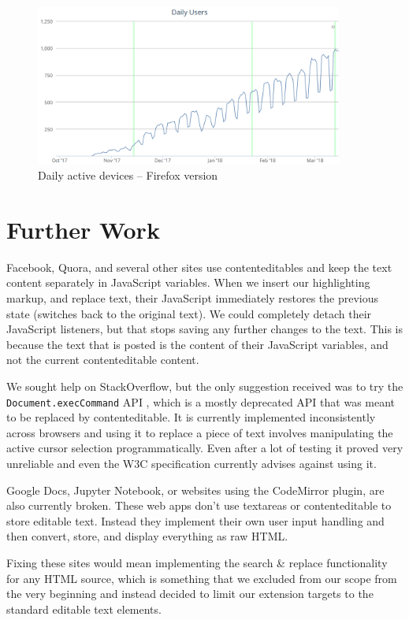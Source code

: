 \documentclass[bsc,frontabs,twoside,singlespacing,parskip,deptreport]{infthesis}
\begin{document}
\begin{figure}[h]
\centering
\includegraphics[width=0.9\textwidth]{../docs/firefox-version-users.png}
\caption{Daily active devices -- Firefox version}
\end{figure}

\section{Further Work}
Facebook, Quora, and several other sites use contenteditables and keep the text content separately in JavaScript variables. When we insert our highlighting markup, and replace text, their JavaScript immediately restores the previous state (switches back to the original text). We could completely detach their JavaScript listeners, but that stops saving any further changes to the text. This is because the text that is posted is the content of their JavaScript variables, and not the current contenteditable content.

We sought help on StackOverflow, but the only suggestion received was to try the \texttt{Document.execCommand} API \cite{A10}, which is a mostly deprecated API that was meant to be replaced by contenteditable. It is currently implemented inconsistently across browsers and using it to replace a piece of text involves manipulating the active cursor selection programmatically. Even after a lot of testing it proved very unreliable and even the W3C specification currently advises against using it.

Google Docs, Jupyter Notebook, or websites using the CodeMirror plugin, are also currently broken. These web apps don't use textareas or contenteditable to store editable text. Instead they implement their own user input handling and then convert, store, and display everything as raw HTML.

Fixing these sites would mean implementing the search \& replace functionality for any HTML source, which is something that we excluded from our scope from the very beginning and instead decided to limit our extension targets to the standard editable text elements.
\end{document}
